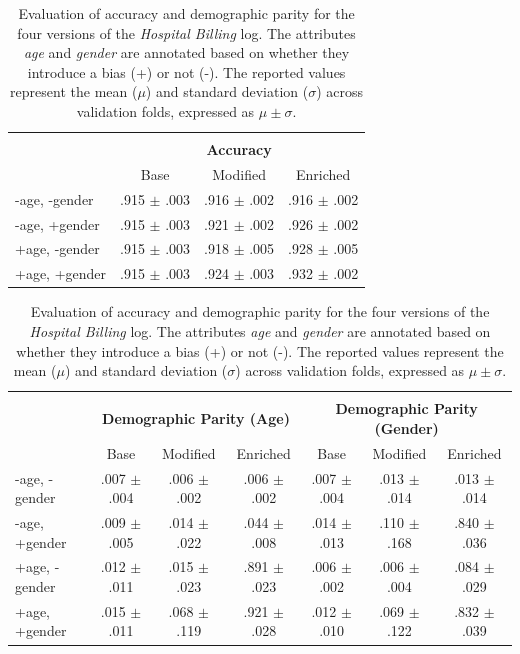 \begin{table}[h!]
    \centering
    \scriptsize
    \renewcommand{\arraystretch}{1.2}
    \setlength{\tabcolsep}{6pt}
    \begin{tabular}{>{\centering\arraybackslash}m{1.9cm} | ccc}
        \toprule
        \makecell{\textbf{Event Log}\\[1ex]} & \multicolumn{3}{c}{\textbf{Accuracy}} \\
        & Base & Modified & Enriched \\
        \midrule
        -age, -gender &  .915 $\pm$ .003 &  .916 $\pm$ .002 &  .916 $\pm$ .002 \\
        -age, +gender &  .915 $\pm$ .003 &  .921 $\pm$ .002 &  .926 $\pm$ .002 \\
        +age, -gender &  .915 $\pm$ .003 &  .918 $\pm$ .005 &  .928 $\pm$ .005 \\
        +age, +gender &  .915 $\pm$ .003 &  .924 $\pm$ .003 &  .932 $\pm$ .002 \\
        \bottomrule
    \end{tabular}

    \vspace{0.3cm}

    \begin{tabularx}{\textwidth}{>{\centering\arraybackslash}m{1.9cm} | ccc | ccc}
        \toprule
        \makecell{\textbf{Event Log}\\[1ex]} & \multicolumn{3}{c|}{\textbf{Demographic Parity (Age)}} & \multicolumn{3}{c}{\textbf{Demographic Parity (Gender)}} \\
        & Base & Modified & Enriched & Base & Modified & Enriched \\
        \midrule
        -age, -gender &  .007 $\pm$ .004 &  .006 $\pm$ .002 &  .006 $\pm$ .002 &  .007 $\pm$ .004 &  .013 $\pm$ .014 &  .013 $\pm$ .014 \\
        -age, +gender &  .009 $\pm$ .005 &  .014 $\pm$ .022 &  .044 $\pm$ .008 &  .014 $\pm$ .013 &  .110 $\pm$ .168 &  .840 $\pm$ .036 \\
        +age, -gender &  .012 $\pm$ .011 &  .015 $\pm$ .023 &  .891 $\pm$ .023 &  .006 $\pm$ .002 &  .006 $\pm$ .004 &  .084 $\pm$ .029 \\
        +age, +gender &  .015 $\pm$ .011 &  .068 $\pm$ .119 &  .921 $\pm$ .028 &  .012 $\pm$ .010 &  .069 $\pm$ .122 &  .832 $\pm$ .039 \\
        \bottomrule
    \end{tabularx}
    \vspace{0.2cm}
    \caption{Evaluation of accuracy and demographic parity for the four versions of the \textit{Hospital Billing} log.
    The attributes \textit{age} and \textit{gender} are annotated based on whether they introduce a bias (+) or not (-).
    The reported values represent the mean ($\mu$) and standard deviation ($\sigma$) across validation folds, expressed as $\mu \pm \sigma$.}
    \label{tab:hb_combined}
\end{table}

